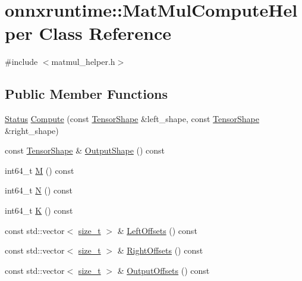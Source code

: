 \hypertarget{classonnxruntime_1_1MatMulComputeHelper}{}\section{onnxruntime\+:\+:Mat\+Mul\+Compute\+Helper Class Reference}
\label{classonnxruntime_1_1MatMulComputeHelper}


{\ttfamily \#include $<$matmul\+\_\+helper.\+h$>$}

\subsection*{Public Member Functions}
\begin{DoxyCompactItemize}
\item 
\mbox{\hyperlink{classonnxruntime_1_1common_1_1Status}{Status}} \mbox{\hyperlink{classonnxruntime_1_1MatMulComputeHelper_a03b36f22431349e37fd118581fa4699d}{Compute}} (const \mbox{\hyperlink{classonnxruntime_1_1TensorShape}{Tensor\+Shape}} \&left\+\_\+shape, const \mbox{\hyperlink{classonnxruntime_1_1TensorShape}{Tensor\+Shape}} \&right\+\_\+shape)
\item 
const \mbox{\hyperlink{classonnxruntime_1_1TensorShape}{Tensor\+Shape}} \& \mbox{\hyperlink{classonnxruntime_1_1MatMulComputeHelper_a6cb53d90e64d3f2eb89e652c4fb80e68}{Output\+Shape}} () const
\item 
int64\+\_\+t \mbox{\hyperlink{classonnxruntime_1_1MatMulComputeHelper_aeda5e04dc34b4d6265a38b399bc22699}{M}} () const
\item 
int64\+\_\+t \mbox{\hyperlink{classonnxruntime_1_1MatMulComputeHelper_a1738caddac071c9807238df60a792fc9}{N}} () const
\item 
int64\+\_\+t \mbox{\hyperlink{classonnxruntime_1_1MatMulComputeHelper_a74f1f2eae27647d3e68531c3901053de}{K}} () const
\item 
const std\+::vector$<$ \mbox{\hyperlink{mlasi_8h_a503efbc1c6e50825320ad909366b78ab}{size\+\_\+t}} $>$ \& \mbox{\hyperlink{classonnxruntime_1_1MatMulComputeHelper_a7570316c3d72e6682213683589abc959}{Left\+Offsets}} () const
\item 
const std\+::vector$<$ \mbox{\hyperlink{mlasi_8h_a503efbc1c6e50825320ad909366b78ab}{size\+\_\+t}} $>$ \& \mbox{\hyperlink{classonnxruntime_1_1MatMulComputeHelper_aac21fe3b8c93d9c3ec5a20b0f629d70c}{Right\+Offsets}} () const
\item 
const std\+::vector$<$ \mbox{\hyperlink{mlasi_8h_a503efbc1c6e50825320ad909366b78ab}{size\+\_\+t}} $>$ \& \mbox{\hyperlink{classonnxruntime_1_1MatMulComputeHelper_a1c7f9ab98b01f7c40c30930821e78523}{Output\+Offsets}} () const
\end{DoxyCompactItemize}
